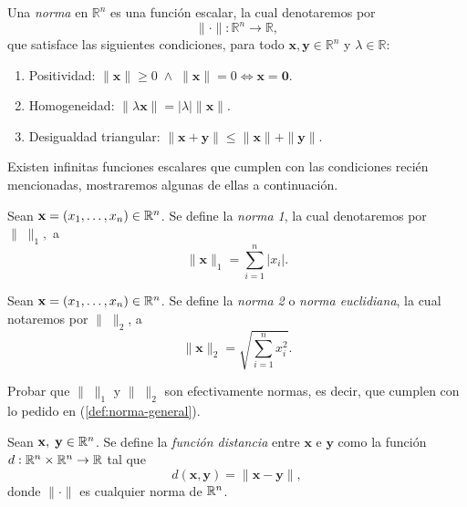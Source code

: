 \begin{definition}\label{def:norma-general}
   Una \emph{norma} en $\mathbb{R}^n$ es una función escalar, la cual denotaremos por $$\|\cdot\|: \mathbb{R}^n \to \mathbb{R},$$ que satisface las siguientes condiciones, para todo $\mathbf{x}, \mathbf{y} \in \mathbb{R}^n$ y $\lambda \in \mathbb{R}$:
    \begin{enumerate}
        \item Positividad: $\|\mathbf{x}\| \geq 0\;\land\;\|\mathbf{x}\| = 0 \iff \mathbf{x} = \boldsymbol{0}$.
        \item Homogeneidad: $\|\lambda \mathbf{x}\| = |\lambda|\|\mathbf{x}\|$.
        \item Desigualdad triangular: $\|\mathbf{x} + \mathbf{y}\| \leq \|\mathbf{x}\| + \|\mathbf{y}\|$.
    \end{enumerate}
\end{definition}

\begin{obs}
  Existen infinitas funciones escalares que cumplen con las condiciones reci\'en mencionadas, mostraremos algunas de ellas a continuaci\'on.
\end{obs}

\begin{definition}\label{def:norm1}   Sean $\mathbf{x}=(x_1,\ldots,x_n) \in\mathbb{R}^n$. Se define la \emph{norma 1},  la cual denotaremos por $\| \; \|_1,$  a 
    \[
        \|\mathbf{x}\|_1 = \sum_{i=1}^n |x_i|.
    \] 
 \end{definition}

\begin{definition}\label{def:norm2}
  Sean $\mathbf{x}=(x_1,\ldots,x_n) \in\mathbb{R}^n$.  Se define la \emph{norma 2} o \emph{norma euclidiana}, la cual notaremos por  $\|\;\|_2$, a
    \[
        \|\mathbf{x}\|_2 = \sqrt{ \sum_{i=1}^n x_i^2 }.
    \]
  \end{definition}

\begin{tarea} Probar que  $\| \; \|_1$ y  $\| \; \|_2$ son efectivamente normas, es decir, que cumplen con  lo pedido en (\ref{def:norma-general}). 
\end{tarea}

\begin{definition}
    Sean $\mathbf{x},\;\mathbf{y}\in\mathbb{R}^n$. Se define la  \emph{ función distancia} entre $\mathbf{x}\text{ e }\mathbf{y}$ como la funci\'on $d:\mathbb{R}^n\times\mathbb{R}^n\to\mathbb{R}$ tal que
    \[
        d(\mathbf{x},\mathbf{y})=\|\mathbf{x}-\mathbf{y}\|,
    \]
    donde $\|\cdot\|$ es  cualquier norma de $\mathbb{R}^n$.
\end{definition}
